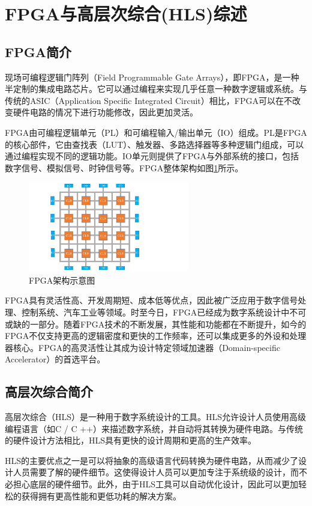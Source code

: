 \section{FPGA与高层次综合(HLS)综述}
\subsection{FPGA简介}
现场可编程逻辑门阵列（Field Programmable Gate Arrays），即FPGA，是一种半定制的集成电路芯片。它可以通过编程来实现几乎任意一种数字逻辑或系统\cite{kuon2008fpga}。与传统的ASIC（Application Specific Integrated Circuit）相比，FPGA可以在不改变硬件电路的情况下进行功能修改，因此更加灵活。 

FPGA由可编程逻辑单元（PL）和可编程输入/输出单元（IO）组成。PL是FPGA的核心部件，它由查找表（LUT）、触发器、多路选择器等多种逻辑门组成，可以通过编程实现不同的逻辑功能。IO单元则提供了FPGA与外部系统的接口，包括数字信号、模拟信号、时钟信号等。FPGA整体架构如图\ref{fig:FPGA}所示。
\begin{figure}
    \centering
    \includegraphics[width=7cm]{figures/FPGA.pdf}
    \caption{FPGA架构示意图}
    \label{fig:FPGA}
\end{figure}

FPGA具有灵活性高、开发周期短、成本低等优点，因此被广泛应用于数字信号处理、控制系统、汽车工业等领域。时至今日，FPGA已经成为数字系统设计中不可或缺的一部分。随着FPGA技术的不断发展，其性能和功能都在不断提升，如今的FPGA不仅支持更高的逻辑密度和更快的工作频率，还可以集成更多的外设和处理器核心。FPGA的高灵活性让其成为设计特定领域加速器（Domain-specific Accelerator）的首选平台。

\subsection{高层次综合简介}

高层次综合（HLS）是一种用于数字系统设计的工具。HLS允许设计人员使用高级编程语言（如C / C ++）来描述数字系统，并自动将其转换为硬件电路。与传统的硬件设计方法相比，HLS具有更快的设计周期和更高的生产效率。

HLS的主要优点之一是可以将抽象的高级语言代码转换为硬件电路，从而减少了设计人员需要了解的硬件细节。这使得设计人员可以更加专注于系统级的设计，而不必担心底层的硬件细节。此外，由于HLS工具可以自动优化设计，因此可以更加轻松的获得拥有更高性能和更低功耗的解决方案。

